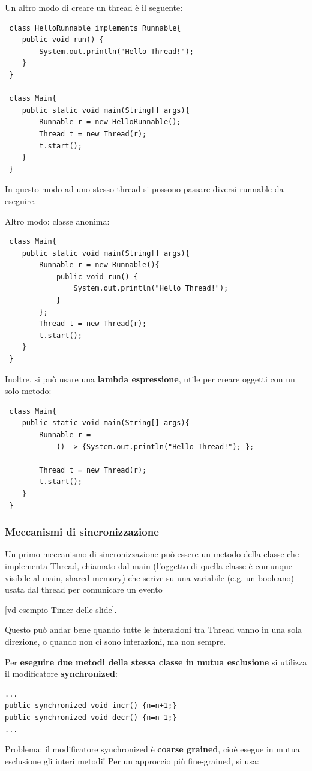 \documentclass[a4paper,10pt]{article}
\begin{document}
 Un altro modo di creare un thread è il seguente:
 
 \begin{lstlisting}
 class HelloRunnable implements Runnable{
    public void run() {
        System.out.println("Hello Thread!");
    }
 }
 
 class Main{
    public static void main(String[] args){
        Runnable r = new HelloRunnable();
        Thread t = new Thread(r);
        t.start();
    }
 }
 \end{lstlisting}
In questo modo ad uno stesso thread si possono passare diversi runnable da eseguire.\smallskip

Altro modo: classe anonima:
\begin{lstlisting}
 class Main{
    public static void main(String[] args){
        Runnable r = new Runnable(){
            public void run() {
                System.out.println("Hello Thread!");
            }
        };
        Thread t = new Thread(r);
        t.start();
    }
 }
\end{lstlisting}

Inoltre, si può usare una \textbf{lambda espressione}, utile per creare oggetti con un solo metodo:
\begin{lstlisting}
 class Main{
    public static void main(String[] args){
        Runnable r = 
            () -> {System.out.println("Hello Thread!"); };
            
        Thread t = new Thread(r);
        t.start();
    }
 }
\end{lstlisting}


\subsubsection{Meccanismi di sincronizzazione}
Un primo meccanismo di sincronizzazione può essere un metodo della classe che implementa Thread, chiamato dal main (l'oggetto di quella classe è comunque visibile al main, shared memory) che scrive su una variabile (e.g. un booleano) usata dal thread per comunicare un evento 

[vd esempio Timer delle slide].\smallskip

Questo può andar bene quando tutte le interazioni tra Thread vanno in una sola direzione, o quando non ci sono interazioni, ma non sempre.\medskip

Per \textbf{eseguire due metodi della stessa classe in mutua esclusione} si utilizza il modificatore \textbf{synchronized}:

\begin{lstlisting}
...
public synchronized void incr() {n=n+1;}
public synchronized void decr() {n=n-1;}
...
\end{lstlisting}
Problema: il modificatore synchronized è \textbf{coarse grained}, cioè esegue in mutua esclusione gli interi metodi! Per un approccio più fine-grained, si usa:
\end{document}
